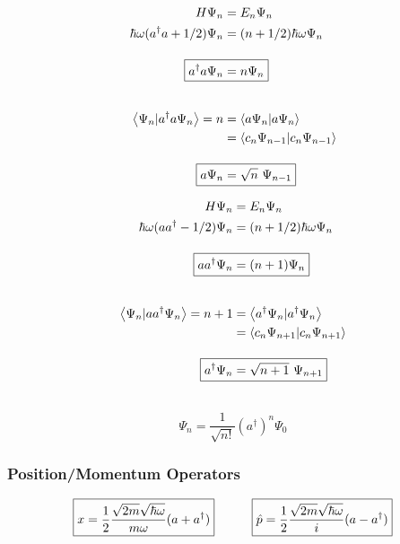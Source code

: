 \documentclass[12pt]{article}
\begin{document}
\noindent 
\begin{minipage}{0.5\textwidth}
    \begin{align*}
        \hspace{1.0cm} H \Psi_n &= E_n \Psi_n \\
        \hbar \omega (a^\dagger a + 1/2) \Psi_n &= (n+1/2) \hbar \omega \Psi_n\\[10pt]
        \Aboxed{ a^\dagger a \Psi_n &= n \Psi_n }\\[20pt]
        \left< \Psi_n | a^\dagger a \Psi_n \right> ={} n
        &= \left< a \Psi_n | a \Psi_n \right>\\
        &= \left< c_n \Psi_{n-1} | c_n \Psi_{n-1} \right>\\[10pt]
        \Aboxed{ a \Psi_n &= \sqrt{n} \ \Psi_{n-1} }
    \end{align*}
\end{minipage}
\begin{minipage}{0.5\textwidth}
\begin{align*}
    \hspace{1.0cm} H \Psi_n &= E_n \Psi_n \\
    \hbar \omega (a a^\dagger - 1/2) \Psi_n &= (n+1/2) \hbar \omega \Psi_n\\[10pt]
    \Aboxed{ a a^\dagger \Psi_n &= (n+1) \Psi_n }\\[20pt]
    \left< \Psi_n | a a^\dagger \Psi_n \right> ={} n+1
    &= \left< a^\dagger \Psi_n | a^\dagger \Psi_n \right>\\
    &= \left< c_n \Psi_{n+1} | c_n \Psi_{n+1} \right>\\[10pt]
    \Aboxed{ a^\dagger \Psi_n &= \sqrt{n+1} \ \Psi_{n+1} }
\end{align*}
\end{minipage}

\hfill \break \\
\[ \boxed{ \Psi_n = \frac{1}{ \sqrt{n!} }(a^\dagger)^n \Psi_0 }\]

\subsubsection{Position/Momentum Operators}
\vspace{5pt}
\[ \boxed{ \displaystyle x = \frac{1}{2} 
        \frac{ \sqrt{2 m} \sqrt{\hbar \omega} }{m \omega} (a + a^\dagger) }
    \indent \indent 
    \boxed{ \hat{p} = \frac{1}{2} 
        \frac{ \sqrt{2 m} \sqrt{\hbar \omega} }{i} (a - a^\dagger) } \]
\end{document}
